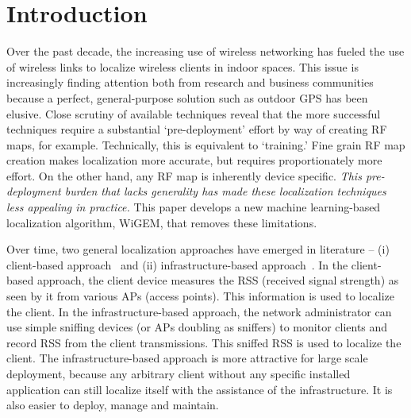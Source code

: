 \section{Introduction}
\label{sec:introduction}

Over the past decade, the increasing use of wireless networking has fueled the 
use of wireless links to localize wireless clients in indoor spaces. This issue
is increasingly finding attention both from research and business communities 
because a perfect, general-purpose solution such as outdoor GPS has been elusive. Close scrutiny 
of available techniques reveal that the more successful techniques require a substantial
`pre-deployment' effort by way of creating RF maps, for example. 
Technically, this is equivalent
to `training.' Fine grain RF map creation makes localization 
more accurate, but requires proportionately more effort.
On the other hand, any RF map is inherently device specific.
\emph{This pre-deployment burden that lacks generality
has made these localization techniques less appealing in practice.}  This paper develops a new machine learning-based localization algorithm, WiGEM,
that removes these limitations. 


Over time, two general localization approaches have emerged 
in literature -- (i) client-based approach~\cite{Haeberlen:2004:PRL:1023720.1023728, Gwon:2004:ECC:1023783.1023786, Youssef:2008:HLD:1399551.1399558, Chintalapudi:2010:ILW:1859995.1860016, Ladd:2002:RLS:570645.570674, Youssef:2003:WLD:826025.826335} and (ii)  infrastructure-based approach~\cite{Moraes:2006:CWL:1164783.1164799, Lim:2010:ZIL:1741400.1741464, Tao:2003:WLL:941311.941314, Krishnan04asystem}. In the client-based approach, the client device measures the RSS (received signal strength) as seen by it from various APs (access points). This information is used to localize the client. In the infrastructure-based approach, the network administrator can use simple sniffing devices (or APs doubling as sniffers) to monitor clients and record RSS from the client transmissions.  This sniffed RSS is used to localize the client. The infrastructure-based approach is more attractive for large scale deployment, because
any arbitrary client without any specific installed application can still localize itself
with the assistance of the infrastructure. It is also easier to deploy, manage and maintain. 


